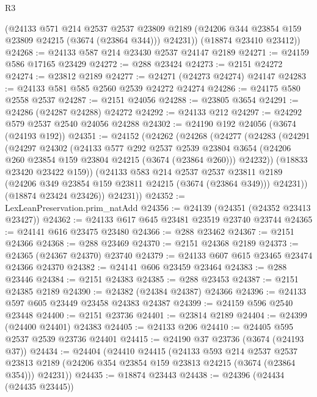 \begin{lexlean}{R3}
\begin{coremodule}
        (@24133
          @571
          @214
          @2537
          @2537
          @23809
          @2189
          (@24206 @344 @23854 @159 @23809 @24215 (@3674 (@23864 @344)))
          @24231))
      (@18874 @23410 @23412))
@24268 := @24133 @587 @214 @23430 @2537 @24147 @2189
@24271 := @24159 @586 @17165 @23429
@24272 := @288 @23424
@24273 := @2151 @24272
@24274 := @23812 @2189
@24277 := @24271 (@24273 @24274) @24147
@24283 := @24133 @581 @585 @2560 @2539 @24272 @24274
@24286 := @24175 @580 @2558 @2537
@24287 := @2151 @24056
@24288 := @23805 @3654
@24291 := @24286 (@24287 @24288) @24272
@24292 := @24133 @212
@24297 := @24292 @579 @2537 @2540 @24056 @24288
@24302 := @24190 @192 @24056 (@3674 (@24193 @192))
@24351 := @24152
    (@24262
      (@24268
        (@24277
          (@24283
            (@24291
              (@24297
                @24302
                (@24133
                  @577
                  @292
                  @2537
                  @2539
                  @23804
                  @3654
                  (@24206 @260 @23854 @159 @23804 @24215 (@3674 (@23864 @260)))
                  @24232))
              (@18833 @23420 @23422 @159))
            (@24133
              @583
              @214
              @2537
              @2537
              @23811
              @2189
              (@24206 @349 @23854 @159 @23811 @24215 (@3674 (@23864 @349)))
              @24231))
          (@18874 @23424 @23426))
        @24231))
@24352 := LexLeanPreservation.prim_natAdd
@24356 := @24139 (@24351 (@24352 @23413 @23427))
@24362 := @24133 @617 @645 @23481 @23519 @23740 @23744
@24365 := @24141 @616 @23475 @23480
@24366 := @288 @23462
@24367 := @2151 @24366
@24368 := @288 @23469
@24370 := @2151 @24368 @2189
@24373 := @24365 (@24367 @24370) @23740
@24379 := @24133 @607 @615 @23465 @23474 @24366 @24370
@24382 := @24141 @606 @23459 @23464
@24383 := @288 @23446
@24384 := @2151 @24383
@24385 := @288 @23453
@24387 := @2151 @24385 @2189
@24390 := @24382 (@24384 @24387) @24366
@24396 := @24133 @597 @605 @23449 @23458 @24383 @24387
@24399 := @24159 @596 @2540 @23448
@24400 := @2151 @23736
@24401 := @23814 @2189
@24404 := @24399 (@24400 @24401) @24383
@24405 := @24133 @206
@24410 := @24405 @595 @2537 @2539 @23736 @24401
@24415 := @24190 @37 @23736 (@3674 (@24193 @37))
@24434 := @24404
    (@24410
      @24415
      (@24133
        @593
        @214
        @2537
        @2537
        @23813
        @2189
        (@24206 @354 @23854 @159 @23813 @24215 (@3674 (@23864 @354)))
        @24231))
@24435 := @18874 @23443
@24438 := @24396 (@24434 (@24435 @23445))

\end{coremodule}
\end{lexlean}
